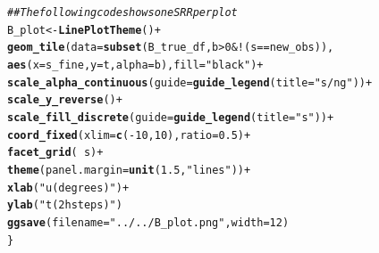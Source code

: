 \documentclass[a4paper,11pt]{article}\usepackage[]{graphicx}\usepackage[]{color}
\makeatletter
\newcommand{\hlnum}[1]{\textcolor[rgb]{0.686,0.059,0.569}{#1}}%
\newcommand{\hlstr}[1]{\textcolor[rgb]{0.192,0.494,0.8}{#1}}%
\newcommand{\hlcom}[1]{\textcolor[rgb]{0.678,0.584,0.686}{\textit{#1}}}%
\newcommand{\hlopt}[1]{\textcolor[rgb]{0,0,0}{#1}}%
\newcommand{\hlstd}[1]{\textcolor[rgb]{0.345,0.345,0.345}{#1}}%
\newcommand{\hlkwb}[1]{\textcolor[rgb]{0.69,0.353,0.396}{#1}}%
\newcommand{\hlkwc}[1]{\textcolor[rgb]{0.333,0.667,0.333}{#1}}%
\newcommand{\hlkwd}[1]{\textcolor[rgb]{0.737,0.353,0.396}{\textbf{#1}}}%
\newenvironment{kframe}{%
 \def\at@end@of@kframe{}%
 \ifinner\ifhmode%
  \def\at@end@of@kframe{\end{minipage}}%
  \begin{minipage}{\columnwidth}%
 \fi\fi%
 \def\FrameCommand##1{\hskip\@totalleftmargin \hskip-\fboxsep
 \colorbox{shadecolor}{##1}\hskip-\fboxsep
     \hskip-\linewidth \hskip-\@totalleftmargin \hskip\columnwidth}%
 \MakeFramed {\advance\hsize-\width
   \@totalleftmargin\z@ \linewidth\hsize
   \@setminipage}}%
 {\par\unskip\endMakeFramed%
 \at@end@of@kframe}
\newenvironment{knitrout}{}{} %
\makeatother
\begin{document}
\begin{knitrout}
\begin{kframe}
\begin{alltt}
  \hlcom{## The following code shows one SRR per plot  }
  \hlstd{B_plot} \hlkwb{<-} \hlkwd{LinePlotTheme}\hlstd{()} \hlopt{+}
    \hlkwd{geom_tile}\hlstd{(}\hlkwc{data}\hlstd{=}\hlkwd{subset}\hlstd{(B_true_df,b}\hlopt{>}\hlnum{0} \hlopt{& !}\hlstd{(s}\hlopt{==}\hlstd{new_obs)),}
              \hlkwd{aes}\hlstd{(}\hlkwc{x}\hlstd{=s_fine,}\hlkwc{y}\hlstd{=t,}\hlkwc{alpha}\hlstd{=b),}\hlkwc{fill}\hlstd{=}\hlstr{"black"}\hlstd{)} \hlopt{+}
    \hlkwd{scale_alpha_continuous}\hlstd{(}\hlkwc{guide}\hlstd{=}\hlkwd{guide_legend}\hlstd{(}\hlkwc{title}\hlstd{=}\hlstr{"s/ng"}\hlstd{))} \hlopt{+}
    \hlkwd{scale_y_reverse}\hlstd{()}\hlopt{+}
    \hlkwd{scale_fill_discrete}\hlstd{(}\hlkwc{guide}\hlstd{=}\hlkwd{guide_legend}\hlstd{(}\hlkwc{title}\hlstd{=}\hlstr{"s"}\hlstd{))} \hlopt{+}
    \hlkwd{coord_fixed}\hlstd{(}\hlkwc{xlim}\hlstd{=}\hlkwd{c}\hlstd{(}\hlopt{-}\hlnum{10}\hlstd{,}\hlnum{10}\hlstd{),}\hlkwc{ratio} \hlstd{=} \hlnum{0.5}\hlstd{)}  \hlopt{+}
    \hlkwd{facet_grid}\hlstd{(}\hlopt{~}\hlstd{s)} \hlopt{+}
    \hlkwd{theme}\hlstd{(}\hlkwc{panel.margin} \hlstd{=} \hlkwd{unit}\hlstd{(}\hlnum{1.5}\hlstd{,} \hlstr{"lines"}\hlstd{))} \hlopt{+}
    \hlkwd{xlab}\hlstd{(}\hlstr{"u (degrees)"}\hlstd{)} \hlopt{+}
    \hlkwd{ylab}\hlstd{(}\hlstr{"t (2 h steps)"}\hlstd{)}
  \hlkwd{ggsave}\hlstd{(}\hlkwc{filename} \hlstd{=} \hlstr{"../../B_plot.png"}\hlstd{,}\hlkwc{width}\hlstd{=}\hlnum{12}\hlstd{)}
\hlstd{\}}
\end{alltt}
\end{kframe}
\end{knitrout}
\end{document}
